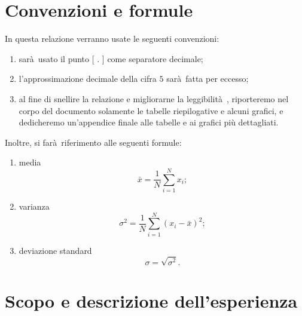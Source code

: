 \documentclass[10pt,oneside,a4paper]{article}
\begin{document}
\section{Convenzioni e formule}
In questa relazione verranno usate le seguenti convenzioni:
\begin{enumerate}
	\item sarà usato il punto [ $.$ ] come separatore decimale;
	\item l'approssimazione decimale della cifra $5$ sarà fatta per eccesso;
	\item al fine di snellire la relazione e migliorarne la leggibilità , riporteremo nel corpo del documento solamente le tabelle riepilogative e alcuni grafici, e dedicheremo un'appendice finale alle tabelle e ai grafici più dettagliati.
\end{enumerate}
Inoltre, si farà riferimento alle seguenti formule:
\begin{enumerate}
	\item media 
	\begin{equation}\label{eq:media}
	\bar{x} = \frac{1}{N}\sum_{i=1}^Nx_i;
	\end{equation}
	\item varianza
	\begin{equation}\label{eq:varianza}
	\sigma^2 = \frac{1}{N}\sum_{i=1}^N(x_i-\bar{x})^2;
	\end{equation}
	\item deviazione standard
	\begin{equation}\label{eq:deviazione}
	\sigma = \sqrt{\sigma^2}.
	\end{equation}	
\end{enumerate}

\section{Scopo e descrizione dell'esperienza}
\label{sec:descrizione}
\end{document}
